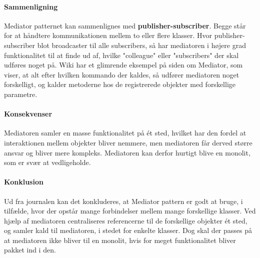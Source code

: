 \paragraph{Sammenligning}

Mediator patternet kan sammenlignes med \textbf{publisher-subscriber}. Begge står for at håndtere kommunikationen mellem to eller flere klasser. Hvor publisher-subscriber blot broadcaster til alle subscribers, så har mediatoren i højere grad funktionalitet til at finde ud af, hvilke "colleague" eller "subscribers" der skal udføres noget på. Wiki har et glimrende eksempel på siden om Mediator, som viser, at alt efter hvilken kommando der kaldes, så udfører mediatoren noget forskelligt, og kalder metoderne hos de registrerede objekter med forskellige parametre.

\paragraph{Konsekvenser}
Mediatoren samler en masse funktionalitet på ét sted, hvilket har den fordel at interaktionen mellem objekter bliver nemmere, men mediatoren får derved større ansvar og bliver mere kompleks. Mediatoren kan derfor hurtigt blive en monolit, som er svær at vedligeholde.

\paragraph{Konklusion}
Ud fra journalen kan det konkluderes, at Mediator pattern er godt at bruge, i tilfælde, hvor der opstår mange forbindelser mellem mange forskellige klasser. Ved hjælp af mediatoren centraliseres referencerne til de forskellige objekter ét sted, og samler kald til mediatoren, i stedet for enkelte klasser. Dog skal der passes på at mediatoren ikke bliver til en monolit, hvis for meget funktionalitet bliver pakket ind i den.

